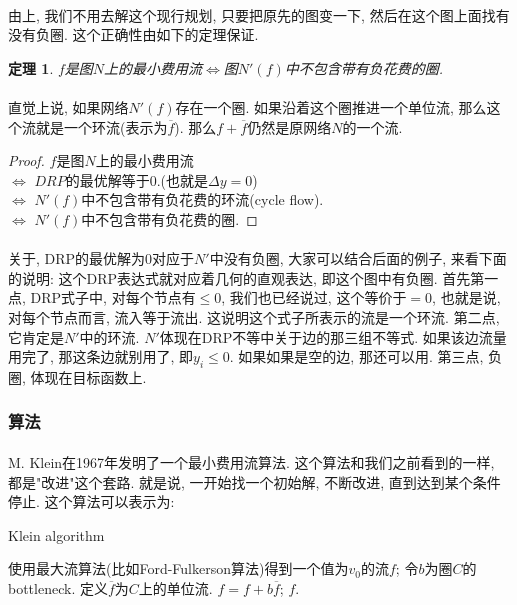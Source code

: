 \documentclass[a4paper]{article}
\newtheorem*{theorem}{定理}
\begin{document}
        \paragraph{}由上, 我们不用去解这个现行规划, 只要把原先的图变一下, 然后在这个图上面找有没有负圈. 这个正确性由如下的定理保证.
        \begin{theorem}
        $f$是图$N$上的最小费用流$\Leftrightarrow$图$N'(f)$中不包含带有负花费的圈.
        \end{theorem}
        \paragraph{}直觉上说, 如果网络$N'(f)$存在一个圈. 如果沿着这个圈推进一个单位流, 那么这个流就是一个环流(表示为$\overline{f}$). 那么$f+\overline{f}$仍然是原网络$N$的一个流.
        \begin{proof}
$f$是图$N$上的最小费用流 \\
$\Leftrightarrow$  $DRP$的最优解等于$0$.(也就是$\Delta y = 0$) \\
$\Leftrightarrow$  $N'(f)$中不包含带有负花费的环流(cycle flow).\\
$\Leftrightarrow$  $N'(f)$中不包含带有负花费的圈.
        \end{proof}
        
        \paragraph{}关于, DRP的最优解为$0$对应于$N'$中没有负圈, 大家可以结合后面的例子, 来看下面的说明: 这个DRP表达式就对应着几何的直观表达, 即这个图中有负圈. 首先第一点, DRP式子中, 对每个节点有$\leq 0$, 我们也已经说过, 这个等价于$=0$, 也就是说, 对每个节点而言, 流入等于流出. 这说明这个式子所表示的流是一个环流. 第二点, 它肯定是$N'$中的环流. $N'$体现在DRP不等中关于边的那三组不等式. 如果该边流量用完了, 那这条边就别用了, 即$y_i \leq 0$. 如果如果是空的边, 那还可以用. 第三点, 负圈, 体现在目标函数上.

        \subsubsection*{算法}
        \paragraph{}M. Klein在1967年发明了一个最小费用流算法. 这个算法和我们之前看到的一样, 都是"改进"这个套路. 就是说, 一开始找一个初始解, 不断改进, 直到达到某个条件停止. 这个算法可以表示为:
        \begin{algorithm}[h]
        \caption{Klein algorithm}
        \label{algorithm: Klein algorithm}
\begin{algorithmic}[1]
    \STATE 使用最大流算法(比如Ford-Fulkerson算法)得到一个值为$v_0$的流$f$;
    \STATE 令$b$为圈$C$的bottleneck.
    \STATE 定义$\overline{f}$为$C$上的单位流.
    \STATE $f=f+b \overline{f}$;
    \ENDWHILE
    \RETURN $f$.
\end{algorithmic}
        \end{algorithm}
\end{document}
